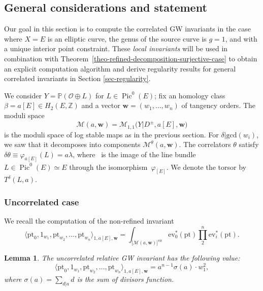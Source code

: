\documentclass[11pt]{article}
\numberwithin{equation}{section}
\newcommand{\vir}[1]{\big[#1\big]^\mathrm{vir}}
\newcommand{\ev}{\mathrm{ev}}
\newcommand{\pt}{\mathrm{pt}}
\newcommand{\Pic}{\operatorname{Pic}}
\newcommand{\PP}{\mathbb{P}}
\newcommand{\ZZ}{\mathbb{Z}}
\newcommand{\bfw}{ {\boldsymbol w} }
\newcommand{\M}{\mathcal{M}}
\renewcommand{\O}{\mathcal{O}}
\numberwithin{equation}{section}
\newtheorem{lem}[theo]{Lemma}
\theoremstyle{definition}
\begin{document}
\subsection{General considerations and statement}

Our goal in this section is to compute the correlated GW invariants in the case where $X=E$ is an elliptic curve, the genus of the source curve is $g=1$, and with a unique interior point constraint. These \textit{local invariants} will be used in combination with Theorem~\ref{theo-refined-decomposition-surjective-case} to obtain an explicit computation algorithm and derive regularity results for general correlated invariants in Section \ref{sec-regularity}.

We consider $Y=\PP(\O\oplus L)$ for $L\in\Pic^0(E)$; fix an homology class $\beta=a[E]\in H_2(E,\ZZ)$ and a vector $\bfw=(w_1,\dots,w_n)$ of tangency orders. The moduli space
\[ \M(a,\bfw)=\M_{1,1}\bigl(Y|D^\pm,a[E],\bfw\bigr) \]
is the moduli space of log stable maps as in the previous section.
For $\delta|\mathrm{gcd}(w_i)$, we saw that it decomposes into components $\M^\theta(a,\bfw)$.
The correlators $\theta$ satisfy
$
\delta\theta\equiv \varphi_{a[E]}(L)=a\lambda$,
where~ is the image of the line bundle $L\in\Pic^0(E)\simeq E$ through the isomorphism~$\varphi_{[E]}$. We denote the torsor by $T^\delta(L,a)$.

\subsubsection{Uncorrelated case} We recall the computation of the non-refined invariant
\[ \langle \pt_0,1_{w_1},\pt_{w_2},\dots,\pt_{w_n}\rangle_{1,a[E],\bfw}=
\int_{\vir{\M(a,\bfw)}}\ev_0^*(\pt)\prod_2^n\ev_i^*(\pt). \]

\begin{lem}\label{lem-non-refined-computation}
The uncorrelated relative GW invariant has the following value:
\[ \langle \pt_0,1_{w_1},\pt_{w_2},\dots,\pt_{w_n}\rangle_{1,a[E],\bfw}=a^{n-1}\sigma(a)\cdot w_1^2, \]
where $\sigma(a)=\sum_{d|a}d$ is the sum of divisors function.
\end{lem}
\end{document}
